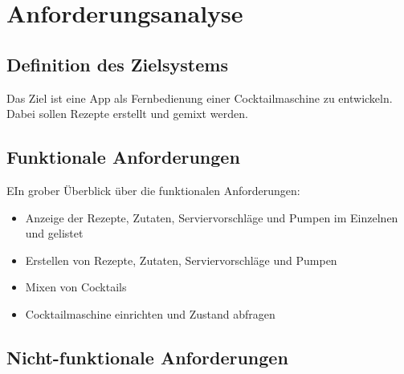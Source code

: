 
\newpage

\chapter{Anforderungsanalyse} %
\label{cha:anforderungsanalyse}


\section{ Definition des Zielsystems}
\label{sec:definition_des_zielsystems}

Das Ziel ist eine App als Fernbedienung einer Cocktailmaschine zu entwickeln. Dabei sollen Rezepte erstellt und gemixt werden. 


\section{Funktionale Anforderungen}
\label{sec:funktionale_anforderungen}
EIn grober Überblick über die funktionalen Anforderungen:
\begin{itemize}
\item Anzeige der Rezepte, Zutaten, Serviervorschläge und Pumpen im Einzelnen und gelistet
\item Erstellen von Rezepte, Zutaten, Serviervorschläge und Pumpen
\item Mixen von Cocktails
\item Cocktailmaschine einrichten und Zustand abfragen
\end{itemize}


\section{Nicht-funktionale Anforderungen}
\label{sec:nicht-funktionale_anforderungen}